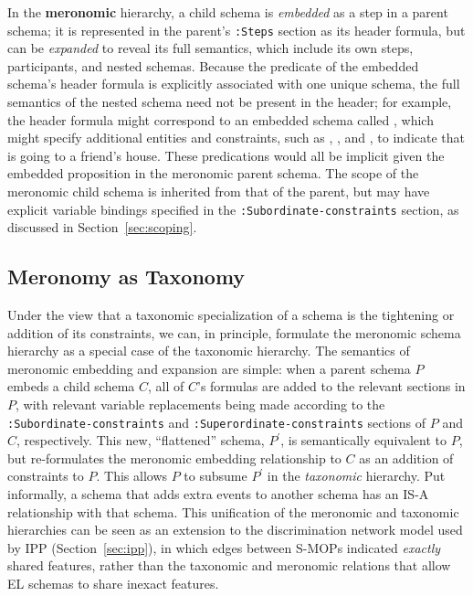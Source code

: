In the \textbf{meronomic} hierarchy, a child schema is \textit{embedded} as a step in a parent schema; it is represented in the parent's \texttt{:Steps} section as its header formula, but can be \textit{expanded} to reveal its full semantics, which include its own steps, participants, and nested schemas.
Because the predicate of the embedded schema's header formula is explicitly associated with one unique schema, the full semantics of the nested schema need not be present in the header; for example, the header formula  might correspond to an embedded schema called , which might specify additional entities and constraints, such as , , and , to indicate that  is going to a friend's house. These predications would all be implicit given the embedded  proposition in the meronomic parent schema.
The scope of the meronomic child schema is inherited from that of the parent, but may have explicit variable bindings specified in the \texttt{:Subordinate-constraints} section, as discussed in Section~\ref{sec:scoping}.

\subsection{Meronomy as Taxonomy}
Under the view that a taxonomic specialization of a schema is the tightening or addition of its constraints, we can, in principle, formulate the meronomic schema hierarchy as a special case of the taxonomic hierarchy. The semantics of meronomic embedding and expansion are simple: when a parent schema $P$ embeds a child schema $C$, all of $C$'s formulas are added to the relevant sections in $P$, with relevant variable replacements being made according to the \texttt{:Subordinate-constraints} and \texttt{:Superordinate-constraints} sections of $P$ and $C$, respectively. This new, ``flattened'' schema, $P^{\prime}$, is semantically equivalent to $P$, but re-formulates the meronomic embedding relationship to $C$ as an addition of constraints to $P$. This allows $P$ to subsume $P^{\prime}$ in the \textit{taxonomic} hierarchy. Put informally, a schema that adds extra events to another schema has an IS-A relationship with that schema. This unification of the meronomic and taxonomic hierarchies can be seen as an extension to the discrimination network model used by IPP (Section~\ref{sec:ipp}), in which edges between S-MOPs indicated \textit{exactly} shared features, rather than the taxonomic and meronomic relations that allow EL schemas to share inexact features.